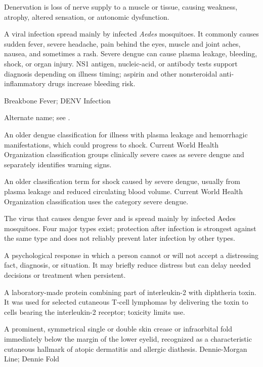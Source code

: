  Denervation is loss of nerve supply to a muscle or tissue, causing weakness, atrophy, altered sensation, or autonomic dysfunction.

 A viral infection spread mainly by infected \textit{Aedes} mosquitoes. It commonly causes sudden fever, severe headache, pain behind the eyes, muscle and joint aches, nausea, and sometimes a rash. Severe dengue can cause plasma leakage, bleeding, shock, or organ injury. NS1 antigen, nucleic-acid, or antibody tests support diagnosis depending on illness timing; aspirin and other nonsteroidal anti-inflammatory drugs increase bleeding risk.

\synonyms
Breakbone Fever; DENV Infection

 Alternate name; see .

 An older dengue classification for illness with plasma leakage and hemorrhagic manifestations, which could progress to shock. Current World Health Organization classification groups clinically severe cases as severe dengue and separately identifies warning signs.

 An older classification term for shock caused by severe dengue, usually from plasma leakage and reduced circulating blood volume. Current World Health Organization classification uses the category severe dengue.

 The virus that causes dengue fever and is spread mainly by infected Aedes mosquitoes. Four major types exist; protection after infection is strongest against the same type and does not reliably prevent later infection by other types.

 A psychological response in which a person cannot or will not accept a distressing fact, diagnosis, or situation. It may briefly reduce distress but can delay needed decisions or treatment when persistent.

 A laboratory-made protein combining part of interleukin-2 with diphtheria toxin. It was used for selected cutaneous T-cell lymphomas by delivering the toxin to cells bearing the interleukin-2 receptor; toxicity limits use.

 A prominent, symmetrical single or double skin crease or infraorbital fold immediately below the margin of the lower eyelid, recognized as a characteristic cutaneous hallmark of atopic dermatitis and allergic diathesis.
\synonyms
Dennie-Morgan Line; Dennie Fold

